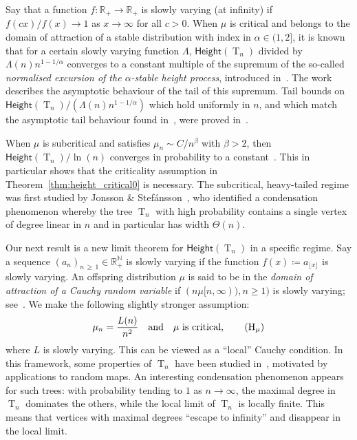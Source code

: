 \documentclass[10pt]{amsart}
\theoremstyle{definition}\newtheorem{defi}[theo]{Definition}\newtheorem{rema}[theo]{Remark}\newtheorem{exam}[theo]{Example}\newtheorem{exem}[theo]{Example}\newtheorem{nota}[theo]{Notation}
\newcommand{\R}{\mathbb{R}}
\newcommand{\N}{\mathbb{N}}
\renewcommand{\H}{\mathsf{Height}}
\DeclareMathOperator{\rtree}{T}
\newcommand{\Tn}{\rtree_{n}}
\begin{document}
Say that a function $f:\R_{+} \to \R_{+}$ is slowly varying (at infinity) if $f(cx)/f(x) \to 1$ as $x \to \infty$ for all $c > 0$. When $\mu$ is critical and belongs to the domain of attraction of a stable distribution with index in $\alpha \in (1,2]$, it is known~\cite{Duq03,Kor13} that for a certain slowly varying function $\Lambda$, $\H(\Tn)$ divided by $\Lambda(n) n^{1-1/\alpha}$ converges to a constant multiple of the supremum of the so-called \emph{normalised excursion of the $\alpha$-stable height process}, introduced in~\cite{LL98}. The work~\cite[Theorem~1.5]{DW17} describes the asymptotic behaviour of the tail of this supremum. Tail bounds on $\H(\Tn)/(\Lambda(n) n^{1-1/\alpha})$ which hold uniformly in $n$, and which match the asymptotic tail behaviour found in~\cite{DW17}, were proved in~\cite{Kor17}.

When $\mu$ is subcritical and satisfies $\mu_n \sim C/n^{\beta}$ with $\beta>2$, then $\H(\Tn)/\ln(n)$ converges in probability to a constant~\cite{Kor15}. This in particular shows that the criticality assumption in Theorem~\ref{thm:height_critical0} is necessary. The subcritical, heavy-tailed regime was first studied by Jonsson \& Stefánsson~\cite{JS11}, who identified a condensation phenomenon whereby the tree $\Tn$ with high probability contains a single vertex of degree linear in $n$ and in particular has width $\Theta(n)$.


Our next result is a new limit theorem for $\H(\rtree_{n})$ in a specific regime. Say a sequence $(a_n)_{n\,\geq\,1}\in \R_{+}^{\N}$ is slowly varying if the function $f(x)\coloneqq a_{\lfloor x\rfloor}$ is slowly varying. An offspring distribution $\mu$ is said to be in the \emph{domain of attraction of a Cauchy random variable} if $(n\mu[n,\infty)),n \ge 1)$ is slowly varying; see~\cite[IX.8, Eq. (8.14)]{Fel71}. We make the following slightly stronger assumption:
\begin{equation}\label{eq:hypmu}
\mu_n= \frac{L(n)}{n^{2}} \quad \text{and} \quad \mu \text{ is critical},
\tag{$\mathrm{H}_\mu$}
\end{equation}
where $L$ is slowly varying. This can be viewed as a ``local'' Cauchy condition. In this framework, some properties of $\rtree_{n}$ have been studied in~\cite{KR19}, motivated by applications to random maps. An interesting condensation phenomenon appears for such trees: with probability tending to $1$ as $n \rightarrow \infty$, the maximal degree in $\Tn$ dominates the others, while the local limit of $\Tn$ is locally finite. This means that vertices with maximal degrees ``escape to infinity'' and disappear in the local limit.
\end{document}
